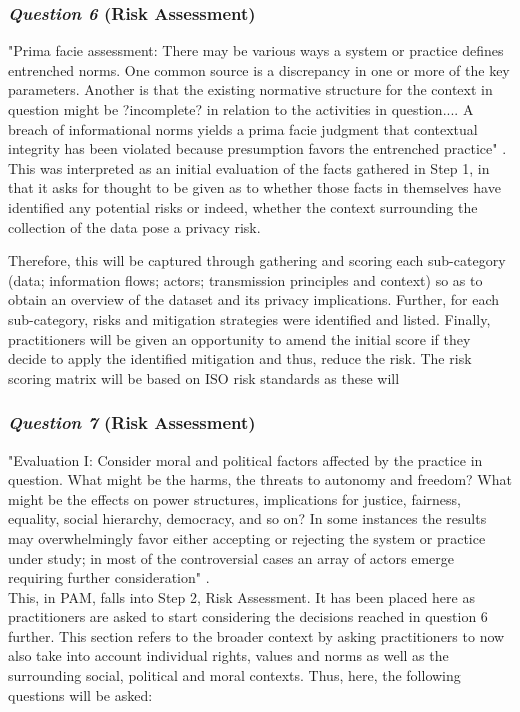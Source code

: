\subsubsection {{\it Question 6} {\bf(Risk Assessment)}}
"Prima facie assessment: There may be various ways a system or practice defines entrenched norms. One common source is a discrepancy in one or more of the key parameters. Another is that the existing normative structure for the context in question might be ?incomplete? in relation to the activities in question.... A breach of informational norms yields a prima facie judgment that contextual integrity has been violated because presumption favors the entrenched practice" \citep{Nissenbaum_2010}.\\

This was interpreted as an initial evaluation of the facts gathered in Step 1, in that it asks for thought to be given as to whether those facts in themselves have identified any potential risks or indeed, whether the context surrounding the collection of the data pose a privacy risk.

Therefore, this will be captured through gathering and scoring each sub-category (data; information flows; actors; transmission principles and context) so as to obtain an overview of the dataset and its privacy implications. Further, for each sub-category, risks and mitigation strategies were identified and listed. Finally, practitioners will be given an opportunity to amend the initial score if they decide to apply the identified mitigation and thus, reduce the risk. The risk scoring matrix will be based on ISO risk standards as these will 
\subsubsection {{\it Question 7} {\bf(Risk Assessment)}}
"Evaluation I: Consider moral and political factors affected by the practice in question. What might be the harms, the threats to autonomy and freedom? What might be the effects on power structures, implications for justice, fairness, equality, social hierarchy, democracy, and so on? In some instances the results may overwhelmingly favor either accepting or rejecting the system or practice under study; in most of the controversial cases an array of actors emerge requiring further consideration" \citep{Nissenbaum_2010}.\\

This, in PAM, falls into Step 2, Risk Assessment. It has been placed here as practitioners are asked to start considering the decisions reached in question 6 further. This section refers to the broader context by asking practitioners to now also take into account individual rights, values and norms as well as the surrounding social, political and moral contexts. Thus, here, the following questions will be asked:\\

